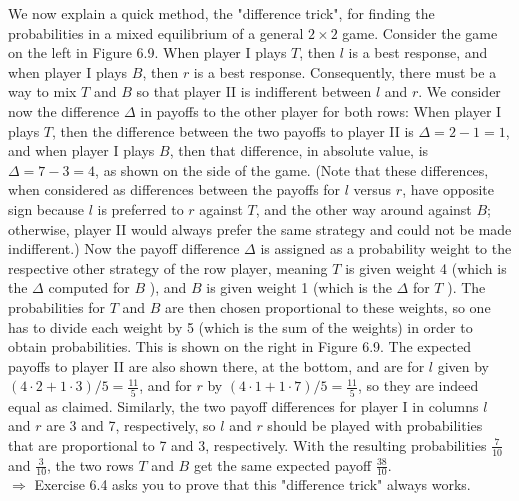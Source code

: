 \documentclass[12pt]{article}
\begin{document}
We now explain a quick method, the "difference trick", for finding the probabilities in a mixed equilibrium of a general $2 \times 2$ game. Consider the game on the left in Figure 6.9. When player I plays $T$, then $l$ is a best response, and when player I plays $B$, then $r$ is a best response. Consequently, there must be a way to mix $T$ and $B$ so that player II is indifferent between $l$ and $r$. We consider now the difference $\Delta$ in payoffs to the other player for both rows: When player I plays $T$, then the difference between the two payoffs to player II is $\Delta=2-1=1$, and when player I plays $B$, then that difference, in absolute value, is $\Delta=7-3=4$, as shown on the side of the game. (Note that these differences, when considered as differences between the payoffs for $l$ versus $r$, have opposite sign because $l$ is preferred to $r$ against $T$, and the other way around against $B$; otherwise, player II would always prefer the same strategy and could not be made indifferent.) Now the payoff difference $\Delta$ is assigned as a probability weight to the respective other strategy of the row player, meaning $T$ is given weight 4 (which is the $\Delta$ computed for $B$ ), and $B$ is given weight 1 (which is the $\Delta$ for $T$ ). The probabilities for $T$ and $B$ are then chosen proportional to these weights, so one has to divide each weight by 5 (which is the sum of the weights) in order to obtain probabilities. This is shown on the right in Figure 6.9. The expected payoffs to player II are also shown there, at the bottom, and are for $l$ given by $(4 \cdot 2+1 \cdot 3) / 5=\frac{11}{5}$, and for $r$ by $(4 \cdot 1+1 \cdot 7) / 5=\frac{11}{5}$, so they are indeed equal as claimed. Similarly, the two payoff differences for player I in columns $l$ and $r$ are 3 and 7, respectively, so $l$ and $r$ should be played with probabilities that are proportional to 7 and 3, respectively. With the resulting probabilities $\frac{7}{10}$ and $\frac{3}{10}$, the two rows $T$ and $B$ get the same expected payoff $\frac{38}{10}$.\\
$\Rightarrow$ Exercise 6.4 asks you to prove that this "difference trick" always works.\\
\end{document}

